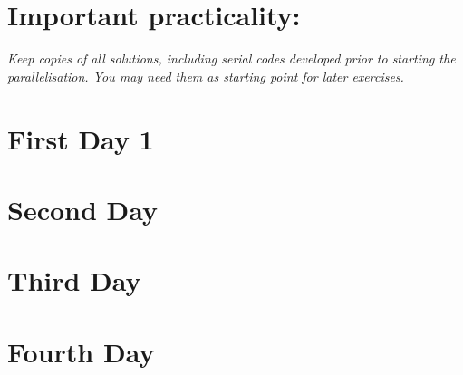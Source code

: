 \documentclass[a4paper,oneside,12pt]{article}
\begin{document}
\section*{Important practicality:}
\textit{Keep copies of all solutions, including serial codes developed prior to starting the parallelisation.  You may need them as starting point for later exercises.}

\pagebreak
\section{First Day 1}



\section{Second Day}



\section{Third Day}

\section{Fourth Day}
\end{document}
